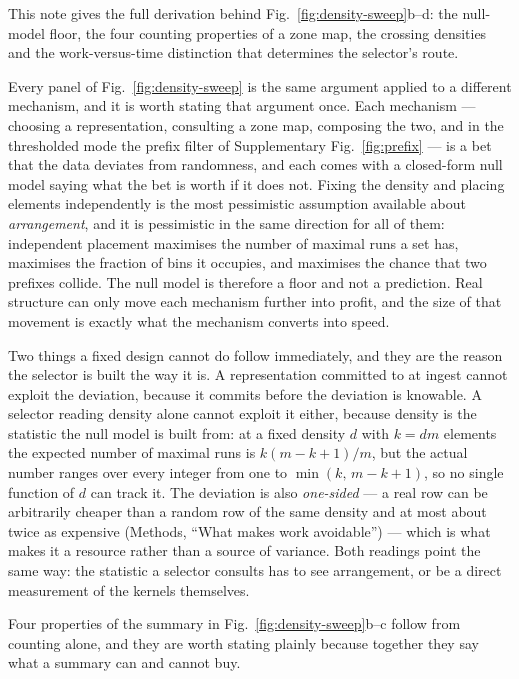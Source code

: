 \label{note:zonemap}

This note gives the full derivation behind Fig.~\ref{fig:density-sweep}b--d: the null-model floor,
the four counting properties of a zone map, the crossing densities and the work-versus-time
distinction that determines the selector's route.

Every panel of Fig.~\ref{fig:density-sweep} is the same argument applied to a different mechanism,
and it is worth stating that argument once. Each mechanism --- choosing a representation, consulting
a zone map, composing the two, and in the thresholded mode the prefix filter of
Supplementary Fig.~\ref{fig:prefix}
--- is a bet that the data deviates from randomness, and each comes with a closed-form null model
saying what the bet is worth if it does not. Fixing the density and placing elements independently is
the most pessimistic assumption available about \emph{arrangement}, and it is pessimistic in the same
direction for all of them: independent placement maximises the number of maximal runs a set has,
maximises the fraction of bins it occupies, and maximises the chance that two prefixes collide.
The null model is therefore a floor and not a prediction. Real structure can only move each
mechanism further into profit, and the size of that movement is exactly what the mechanism converts
into speed.

Two things a fixed design cannot do follow immediately, and they are the reason the selector is built
the way it is. A representation committed to at ingest cannot exploit the deviation, because it
commits before the deviation is knowable. A selector reading density alone cannot exploit it either,
because density is the statistic the null model is built from: at a fixed density $d$ with
$k = dm$ elements the expected number of maximal runs is $k(m-k+1)/m$, but the actual number ranges
over every integer from one to $\min(k,\,m-k+1)$, so no single function of $d$ can track it. The
deviation is also \emph{one-sided} --- a real row can be arbitrarily cheaper than a random row of the
same density and at most about twice as expensive (Methods, ``What makes work avoidable'') --- which
is what makes it a resource
rather than a source of variance. Both readings point the same way: the statistic a selector consults
has to see arrangement, or be a direct measurement of the kernels themselves.

Four properties of the summary in Fig.~\ref{fig:density-sweep}b--c follow from counting alone, and
they are worth stating plainly because together they say what a summary can and cannot buy.

